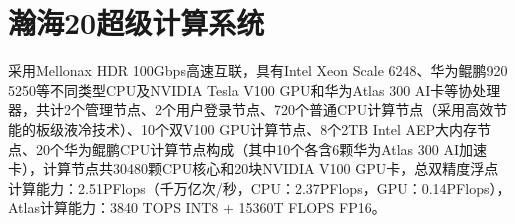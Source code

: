 \documentclass[a4paper,12pt,english]{sphinxmanual}
\begin{document}
\begin{figure}[htbp]
\centering

\noindent{}
\end{figure}

\sphinxstepscope


\section{瀚海20超级计算系统}
\label{\detokenize{introduction/hanhai20-introduction:id1}}\label{\detokenize{introduction/hanhai20-introduction::doc}}
\sphinxAtStartPar
{}采用Mellonax HDR 100Gbps高速互联，具有Intel Xeon Scale 6248、华为鲲鹏920 5250等不同类型CPU及NVIDIA Tesla V100 GPU和华为Atlas 300 AI卡等协处理器，共计2个管理节点、2个用户登录节点、720个普通CPU计算节点（采用高效节能的板级液冷技术）、10个双V100 GPU计算节点、8个2TB Intel AEP大内存节点、20个华为鲲鹏CPU计算节点构成（其中10个各含6颗华为Atlas 300 AI加速卡），计算节点共30480颗CPU核心和20块NVIDIA V100 GPU卡，总双精度浮点计算能力：2.51PFlops（千万亿次/秒，CPU：2.37PFlops，GPU：0.14PFlops），Atlas计算能力：3840 TOPS INT8 + 15360T FLOPS FP16。
\end{document}
